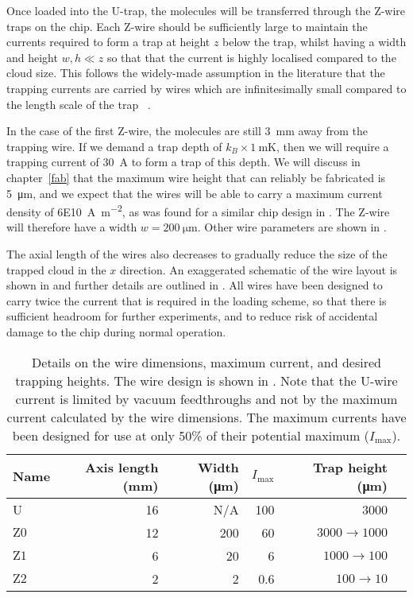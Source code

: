 Once loaded into the U-trap, the molecules will be transferred through the
Z-wire traps on the chip. Each Z-wire should be sufficiently
large to maintain the currents required to form a trap at height $z$ below the
trap, whilst having a width and height  $w, h \ll z$ so that that the current
is highly localised compared to the cloud size.  This follows the widely-made
assumption in the literature that the trapping currents are carried by wires
which are infinitesimally small compared to the length scale of the trap
~\cite{2011Ac}.

In the case of the first Z-wire, the molecules are still \SI{3}{\milli\meter}
away from the trapping wire. If we demand a trap depth of
$k_B\times\SI{1}{\milli\kelvin}$, then we will require a trapping current of
\SI{30}{\ampere} to form a trap of this depth.  We will discuss in
chapter~\ref{fab} that the maximum wire height that can reliably be fabricated
is \SI{5}{\micro\meter}, and we expect that the wires will be able to carry a
maximum current density of \SI{6E10}{\ampere\per\meter\squared}, as was found
for a similar chip design in . The Z-wire will
therefore have a width $w=\SI{200}{\micro\meter}$. Other wire parameters are
shown in .

The axial length of the wires also decreases to gradually reduce the size of
the trapped cloud in the $x$ direction. An exaggerated schematic of the wire
layout is shown in  and further details are
outlined in . All wires have been designed to
carry twice the current that is required in the loading scheme, so that there
is sufficient headroom for further experiments, and to reduce risk of
accidental damage to the chip during normal operation.

\begin{table}
  \centering
\begin{tabular}{lrrrrr}
  Name & Axis length (\si{\milli\meter}) & Width (\si{\micro\meter})& $I_\text{max}$ & Trap height (\si{\micro\meter}) \\
 \hline
  U & 16 & N/A& 100 & 3000\\
  $\mathrm{Z0}$ & 12 & 200& 60& $3000\rightarrow1000$ \\
  $\mathrm{Z1}$ &  6 & 20& 6& $1000\rightarrow100$ \\
  $\mathrm{Z2}$ &  2 & 2& 0.6& $100\rightarrow10$ \\
 \hline
\end{tabular}
  \caption{Details on the wire dimensions, maximum current, and desired
  trapping heights. The wire design is shown in
  . Note that the U-wire current is
  limited by vacuum feedthroughs and not by the maximum current calculated by
  the wire dimensions.  The maximum currents have been designed for use at only
  50\% of their potential maximum ($I_\text{max}$).
  }
  \label{design:table:wires}
\end{table}

